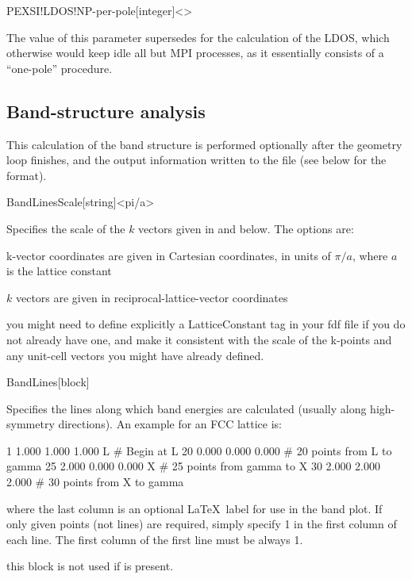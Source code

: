 \begin{fdfentry}{PEXSI!LDOS!NP-per-pole}[integer]<>

  The value of this parameter supersedes  for
  the calculation of the LDOS, which otherwise would keep idle all but
   MPI processes, as it essentially consists of
  a ``one-pole'' procedure.

\end{fdfentry}

\subsection{Band-structure analysis}
\label{sec:band-structure}

This calculation of the band structure is performed optionally after
the geometry loop finishes, and the output information written
to the  file (see below for the format).

\begin{fdfentry}{BandLinesScale}[string]<pi/a>
  
  Specifies the scale of the $k$ vectors given in 
  and  below.  The options are:
  \begin{fdfoptions}
    \option[pi/a]%
    k-vector coordinates are given in Cartesian coordinates, in units
    of $\pi/a$, where $a$ is the lattice constant

    \option[ReciprocalLatticeVectors]%
    $k$ vectors are given in reciprocal-lattice-vector coordinates
  \end{fdfoptions}

  \note you might need to define explicitly a LatticeConstant tag in
  your fdf file if you do not already have one, and make it consistent
  with the scale of the k-points and any unit-cell vectors you might
  have already defined.

\end{fdfentry}

\begin{fdfentry}{BandLines}[block]

  Specifies the lines along which band energies are calculated
  (usually along high-symmetry directions).  An example for an FCC
  lattice is:
  \begin{fdfexample}
       1  1.000  1.000  1.000  L        # Begin at L
      20  0.000  0.000  0.000  \Gamma   # 20 points from L to gamma
      25  2.000  0.000  0.000  X        # 25 points from gamma to X
      30  2.000  2.000  2.000  \Gamma   # 30 points from X to gamma
  \end{fdfexample}
  where the last column is an optional \LaTeX\ label for use in the
  band plot. If only given points (not lines) are required, simply
  specify 1 in the first column of each line. The first column of the
  first line must be always 1.

  \note this block is not used if  is present.

\end{fdfentry}

